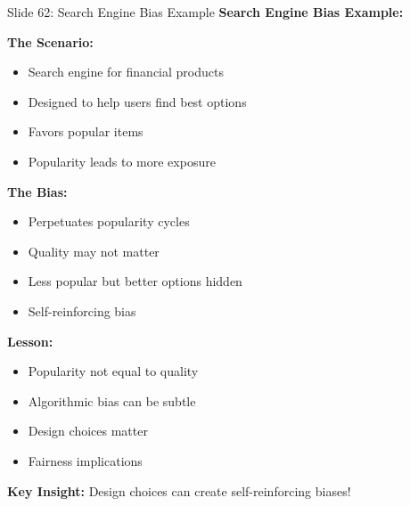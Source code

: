 \documentclass[8pt]{beamer}
\begin{document}
	\begin{frame}{Slide 62: Search Engine Bias Example}
		\fontsize{6.5}{7.5}\selectfont
		\textbf{Search Engine Bias Example:}
		
		\vspace{0.1cm}
		\textbf{The Scenario:}
		\begin{itemize}
			\item Search engine for financial products
			\item Designed to help users find best options
			\item Favors popular items
			\item Popularity leads to more exposure
		\end{itemize}
		
		\vspace{0.1cm}
		\textbf{The Bias:}
		\begin{itemize}
			\item Perpetuates popularity cycles
			\item Quality may not matter
			\item Less popular but better options hidden
			\item Self-reinforcing bias
		\end{itemize}
		
		\vspace{0.1cm}
		\textbf{Lesson:}
		\begin{itemize}
			\item Popularity not equal to quality
			\item Algorithmic bias can be subtle
			\item Design choices matter
			\item Fairness implications
		\end{itemize}
		
		\textcolor{myblue}{\textbf{Key Insight:}} Design choices can \textcolor{myblue}{create self-reinforcing biases}!
	\end{frame}
	
\end{document}
